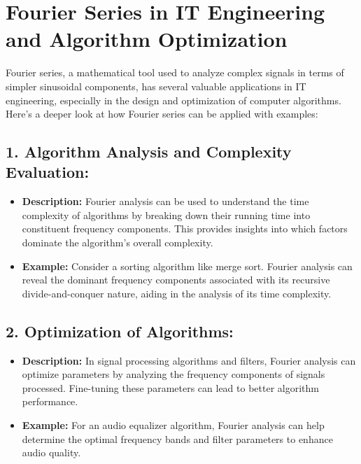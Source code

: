 \documentclass[11pt]{article}
\begin{document}
    \hypertarget{fourier-series-in-it-engineering-and-algorithm-optimization}{%
\section{Fourier Series in IT Engineering and Algorithm
Optimization}\label{fourier-series-in-it-engineering-and-algorithm-optimization}}

Fourier series, a mathematical tool used to analyze complex signals in
terms of simpler sinusoidal components, has several valuable
applications in IT engineering, especially in the design and
optimization of computer algorithms. Here's a deeper look at how Fourier
series can be applied with examples:

\hypertarget{algorithm-analysis-and-complexity-evaluation}{%
\subsection{\texorpdfstring{1. \textbf{Algorithm Analysis and Complexity
Evaluation:}}{1. Algorithm Analysis and Complexity Evaluation:}}\label{algorithm-analysis-and-complexity-evaluation}}

\begin{itemize}
\item
  \textbf{Description:} Fourier analysis can be used to understand the
  time complexity of algorithms by breaking down their running time into
  constituent frequency components. This provides insights into which
  factors dominate the algorithm's overall complexity.
\item
  \textbf{Example:} Consider a sorting algorithm like merge sort.
  Fourier analysis can reveal the dominant frequency components
  associated with its recursive divide-and-conquer nature, aiding in the
  analysis of its time complexity.
\end{itemize}

\hypertarget{optimization-of-algorithms}{%
\subsection{\texorpdfstring{2. \textbf{Optimization of
Algorithms:}}{2. Optimization of Algorithms:}}\label{optimization-of-algorithms}}

\begin{itemize}
\item
  \textbf{Description:} In signal processing algorithms and filters,
  Fourier analysis can optimize parameters by analyzing the frequency
  components of signals processed. Fine-tuning these parameters can lead
  to better algorithm performance.
\item
  \textbf{Example:} For an audio equalizer algorithm, Fourier analysis
  can help determine the optimal frequency bands and filter parameters
  to enhance audio quality.
\end{itemize}
\end{document}
